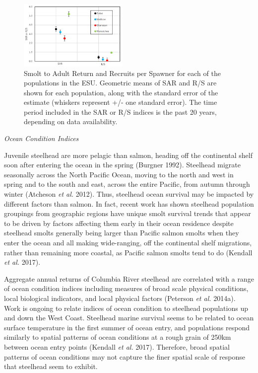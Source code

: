 \documentclass[
  letterpaper,
  oneside,
  open=any]{scrbook}
\begin{document}
\begin{figure}

{\centering \includegraphics[width=2.07in,height=\textheight]{content/Interior_Columbia/../../media/image15.png}

}

\caption{\label{fig-UC-steelhead-Smolt-to-Adult}Smolt to Adult Return
and Recruits per Spawner for each of the populations in the ESU.
Geometric means of SAR and R/S are shown for each population, along with
the standard error of the estimate (whiskers represent +/- one standard
error). The time period included in the SAR or R/S indices is the past
20 years, depending on data availability.}

\end{figure}

\emph{Ocean Condition Indices}

Juvenile steelhead are more pelagic than salmon, heading off the
continental shelf soon after entering the ocean in the spring (Burgner
1992). Steelhead migrate seasonally across the North Pacific Ocean,
moving to the north and west in spring and to the south and east, across
the entire Pacific, from autumn through winter (Atcheson \emph{et al.}
2012). Thus, steelhead ocean survival may be impacted by different
factors than salmon. In fact, recent work has shown steelhead population
groupings from geographic regions have unique smolt survival trends that
appear to be driven by factors affecting them early in their ocean
residence despite steelhead smolts generally being larger than Pacific
salmon smolts when they enter the ocean and all making wide-ranging, off
the continental shelf migrations, rather than remaining more coastal, as
Pacific salmon smolts tend to do (Kendall \emph{et al.} 2017).

Aggregate annual returns of Columbia River steelhead are correlated with
a range of ocean condition indices including measures of broad scale
physical conditions, local biological indicators, and local physical
factors (Peterson \emph{et al.} 2014a). Work is ongoing to relate
indices of ocean condition to steelhead populations up and down the West
Coast. Steelhead marine survival seems to be related to ocean surface
temperature in the first summer of ocean entry, and populations respond
similarly to spatial patterns of ocean conditions at a rough grain of
250km between ocean entry points (Kendall \emph{et al.} 2017).
Therefore, broad spatial patterns of ocean conditions may not capture
the finer spatial scale of response that steelhead seem to exhibit.
\end{document}
